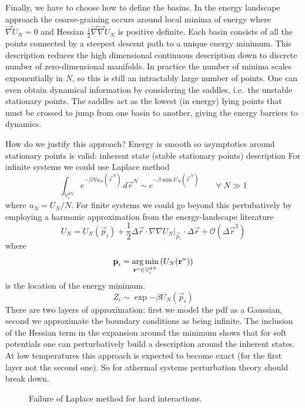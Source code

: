 \documentclass[11pt,twoside]{report}
\begin{document}
Finally, we have to choose how to define the basins.
In the energy landscape approach the coarse-graining occurs around local minima of energy where $\vec{\nabla}U_N = 0$ and Hessian $\frac{1}{2}\vec{\nabla}\vec{\nabla}U_N$ is positive definite.
Each basin consists of all the points connected by a steepest descent path to a unique energy minimum.
This description reduces the high dimensional continuous description down to discrete number of zero-dimensional manifolds.
In practice the number of minima scales exponentially in $N$, so this is still an intractably large number of points.
One can even obtain dynamical information by considering the saddles, i.e.\ the unstable stationary points.
The saddles act as the lowest (in energy) lying points that must be crossed to jump from one basin to another, giving the energy barriers to dynamics.

How do we justify this approach?
Energy is smooth so asymptotics around stationary points is valid: inherent state (stable stationary points) description
For infinite systems we could use Laplace method
\begin{equation}
  \int_{\mathbb{V}^{dN}_i} e^{-\beta N u_N(\vec{r}^N)} \, d\vec{r}^N
  \sim
  e^{-\beta \min{U_N(\vec{r}^N)}} \qquad \forall \; N \gg 1
\end{equation}
where $u_N = U_N / N$.
For finite systems we could go beyond this pertubatively by employing a harmonic approximation from the energy-landscape literature
\begin{equation}
  U_N = U_N(\vec{p}_i) +
  \frac{1}{2} \Delta \vec{r} \cdot \left. \nabla \nabla U_N\right|_{\vec{p}_i} \cdot \Delta \vec{r}
  + \mathcal{O}(\Delta \vec{r}^3)
\end{equation}
where \[\boldsymbol{\mathbf{p}}_i = \operatorname*{arg\,min}_{\boldsymbol{\mathbf{r}}^n \in \mathbb{V}_i^{dN}}{\left(U_N(\boldsymbol{\mathbf{r}}^n)\right)}\] is the location of the energy minimum.
\begin{equation}
  Z_i \sim \exp{-\beta U_N(\vec{p}_i)}
\end{equation}
There are two layers of approximation: first we model the pdf as a Gaussian, second we approximate the boundary conditions as being infinite.
The inclusion of the Hessian term in the expansion around the minimum shows that for soft potentials one can perturbatively build a description around the inherent states.
At low temperatures this approach is expected to become exact (for the first layer not the second one).
So for athermal systems perturbation theory should break down.

\begin{figure}
  \missingfigure[figwidth=\linewidth]{}
  \caption{Failure of Laplace method for hard interactions.}
\end{figure}
\end{document}
